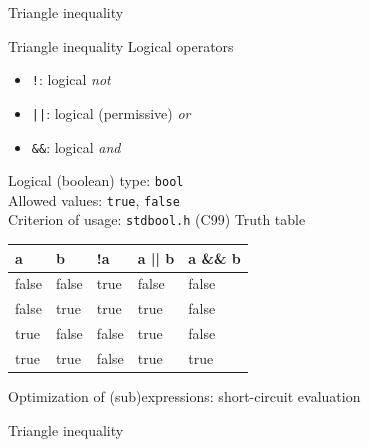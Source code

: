 \documentclass[usenames,dvipsnames,aspectratio=169]{beamer}
\newcommand{\kiemel}[1]{{\color{kiemelesszin}#1}}
\newcommand{\kiemelZ}[1]{{\color{kiemelesszinZ}#1}}
\begin{document}
\begin{frame}{Triangle inequality}
    \begin{exampleblock}{}
    \tiny
    \vspace{-.3cm}
    
    \vspace{-.3cm}
  \end{exampleblock}
\end{frame}

\begin{frame}{Triangle inequality}
  Logical operators
  \begin{itemize}
    \item \kiemel{\texttt{!}}: logical \emph{not}
    \item \kiemel{\texttt{||}}: logical (permissive) \emph{or}
    \item \kiemel{\texttt{\&\&}}: logical \emph{and}
  \end{itemize}
  \vfill
  Logical (boolean) type: \kiemel{\texttt{bool}}\\
  Allowed values: \kiemel{\texttt{true}}, \kiemel{\texttt{false}}\\
  Criterion of usage: \texttt{\kiemel{stdbool.h}} (C99)
  \vfill
  Truth table \\
  \begin{tabular}{lllll}
    a & b & !a & a || b & a \&\& b \\ \hline
    \kiemel{false} & \kiemel{false} & \kiemelZ{true} & \kiemel{false} & \kiemel{false} \\
    \kiemel{false} & \kiemelZ{true} & \kiemelZ{true} & \kiemelZ{true} & \kiemel{false} \\
    \kiemelZ{true} & \kiemel{false} & \kiemel{false} & \kiemelZ{true} & \kiemel{false} \\
    \kiemelZ{true} & \kiemelZ{true} & \kiemel{false} & \kiemelZ{true} & \kiemelZ{true} \\
  \end{tabular}
  \vfill
  Optimization of (sub)expressions: short-circuit evaluation
\end{frame}

\begin{frame}{Triangle inequality}
  \begin{exampleblock}{}
    \scriptsize
    \vspace{-.3cm}
    
    \vspace{-.3cm}
  \end{exampleblock}
\end{frame}
\end{document}
